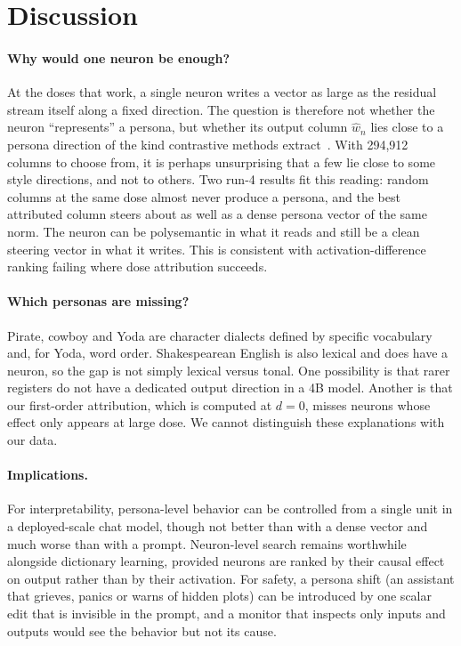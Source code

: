 \documentclass[11pt]{article}
\newcommand{\dose}{d}
\begin{document}
\section{Discussion}

\paragraph{Why would one neuron be enough?} At the doses that work, a single neuron writes a vector as large as the residual stream itself along a fixed direction. The question is therefore not whether the neuron ``represents'' a persona, but whether its output column $\hat w_n$ lies close to a persona direction of the kind contrastive methods extract~\citep{chen2025persona}. With 294,912 columns to choose from, it is perhaps unsurprising that a few lie close to some style directions, and not to others. Two run-4 results fit this reading: random columns at the same dose almost never produce a persona, and the best attributed column steers about as well as a dense persona vector of the same norm. The neuron can be polysemantic in what it reads and still be a clean steering vector in what it writes. This is consistent with activation-difference ranking failing where dose attribution succeeds.

\paragraph{Which personas are missing?} Pirate, cowboy and Yoda are character dialects defined by specific vocabulary and, for Yoda, word order. Shakespearean English is also lexical and does have a neuron, so the gap is not simply lexical versus tonal. One possibility is that rarer registers do not have a dedicated output direction in a 4B model. Another is that our first-order attribution, which is computed at $\dose=0$, misses neurons whose effect only appears at large dose. We cannot distinguish these explanations with our data.

\paragraph{Implications.} For interpretability, persona-level behavior can be controlled from a single unit in a deployed-scale chat model, though not better than with a dense vector and much worse than with a prompt. Neuron-level search remains worthwhile alongside dictionary learning, provided neurons are ranked by their causal effect on output rather than by their activation. For safety, a persona shift (an assistant that grieves, panics or warns of hidden plots) can be introduced by one scalar edit that is invisible in the prompt, and a monitor that inspects only inputs and outputs would see the behavior but not its cause.
\end{document}
